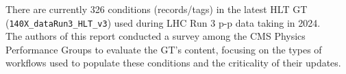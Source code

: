 There are currently 326 conditions (records/tags) in the latest HLT GT (\texttt{140X\_dataRun3\_HLT\_v3}) used during LHC Run 3 p-p data taking in 2024.\\

The authors of this report conducted a survey among the CMS Physics Performance Groups to evaluate the GT's content, focusing on the types of workflows used to populate these conditions and the criticality of their updates.


